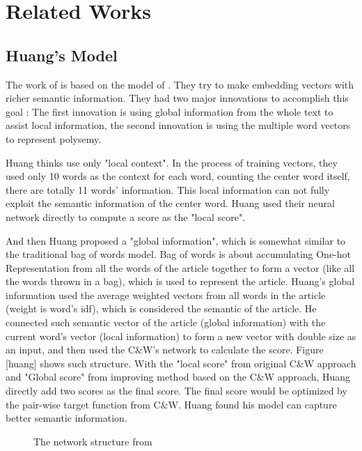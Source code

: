 \chapter{Related Works}
\label{cha:relatedworks}

\section{Huang's Model}


The work of \cite{HuangSocherEtAl2012} is based on the model of \cite{CollobertWeston2008}. They try to make embedding vectors with richer semantic information. They had two major innovations to accomplish this goal : The first innovation is using global information from the whole text to assist local information, the second innovation is using the multiple word vectors to represent polysemy. 

Huang thinks \cite{CollobertWeston2008} use only "local context". In the process of training vectors, they used only 10 words as the context for each word, counting the center word itself, there are totally 11 words' information. 
This local information can not fully exploit the semantic information of the center word. Huang used their neural network directly to compute a score as the "local score". 

And then Huang proposed a "global information", which is somewhat similar to the traditional bag of words model. Bag of words is about accumulating One-hot Representation from all the words of the article together to form a vector (like all the words thrown in a bag), which is used to represent the article. Huang's global information used the average weighted vectors from all words in the article (weight is word's idf), which is considered the semantic of the article. 
He connected such semantic vector of the article (global information) 
with the current word's vector (local information) to form a new vector with double size as an input, and then used the C$\&$W's network to calculate the score. Figure [huang] shows such structure.
With the "local score" from original C$\&$W approach and "Global score" from improving method based on the C$\&$W approach, Huang directly add two scores as the final score. The final score would be optimized by the pair-wise target function from C$\&$W. Huang found his model can capture better semantic information. \\

\begin{figure}[!ht]
  \centering
	\caption{The network structure from \citep{HuangSocherEtAl2012}}
	\label{fig:huang}
\end{figure}


